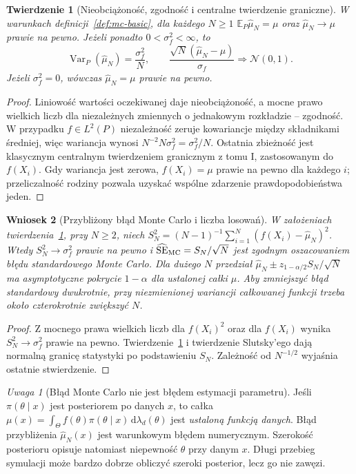 \documentclass[11pt,a4paper,oneside]{report}
\numberwithin{equation}{chapter}
\theoremstyle{plain}
\newtheorem{twierdzenie}{Twierdzenie}[chapter]
\newtheorem{wniosek}[twierdzenie]{Wniosek}
\theoremstyle{definition}
\theoremstyle{remark}
\newtheorem{uwaga}{Uwaga}[chapter]
\newcommand{\E}{\mathbb E}
\newcommand{\Var}{\operatorname{Var}}
\newcommand{\dd}{\mathrm d}
\newcommand{\Normal}{\mathcal N}
\begin{document}
\begin{twierdzenie}[Nieobciążoność, zgodność i centralne twierdzenie graniczne]
\label{thm:mc-lln-clt}
W warunkach definicji~\ref{def:mc-basic}, dla każdego $N\ge1$
$\E_P\widehat\mu_N=\mu$ oraz $\widehat\mu_N\to\mu$
prawie na pewno. Jeżeli ponadto $0<\sigma_f^2<\infty$, to
\[
 \Var_P(\widehat\mu_N)=\frac{\sigma_f^2}{N},\qquad
 \frac{\sqrt N(\widehat\mu_N-\mu)}{\sigma_f}
 \Rightarrow\Normal(0,1).
\]
Jeżeli $\sigma_f^2=0$, wówczas $\widehat\mu_N=\mu$ prawie na pewno.
\end{twierdzenie}
\begin{proof}
Liniowość wartości oczekiwanej daje nieobciążoność, a mocne prawo
wielkich liczb dla niezależnych zmiennych o jednakowym rozkładzie
-- zgodność. W przypadku $f\in L^2(P)$ niezależność zeruje
kowariancje między składnikami średniej, więc wariancja wynosi
$N^{-2}N\sigma_f^2=\sigma_f^2/N$.
Ostatnia zbieżność jest klasycznym centralnym twierdzeniem granicznym
z tomu I, zastosowanym do $f(X_i)$. Gdy wariancja jest zerowa,
$f(X_i)=\mu$ prawie na pewno dla każdego $i$; przeliczalność
rodziny pozwala uzyskać wspólne zdarzenie prawdopodobieństwa jeden.
\end{proof}

\begin{wniosek}[Przybliżony błąd Monte Carlo i liczba losowań]
\label{cor:mc-se}
W założeniach twierdzenia~\ref{thm:mc-lln-clt}, przy $N\ge2$, niech
$S_N^2=(N-1)^{-1}\sum_{i=1}^N(f(X_i)-\widehat\mu_N)^2$.
Wtedy $S_N^2\to\sigma_f^2$ prawie na pewno i
$\widehat{\mathrm{SE}}_{\rm MC}=S_N/\sqrt N$ jest zgodnym
oszacowaniem błędu standardowego Monte Carlo. Dla dużego $N$
przedział $\widehat\mu_N\pm z_{1-\alpha/2}S_N/\sqrt N$
ma asymptotyczne pokrycie $1-\alpha$ dla ustalonej całki $\mu$.
Aby zmniejszyć błąd standardowy dwukrotnie, przy niezmienionej
wariancji całkowanej funkcji trzeba około \emph{czterokrotnie}
zwiększyć $N$.
\end{wniosek}
\begin{proof}
Z mocnego prawa wielkich liczb dla $f(X_i)^2$ oraz dla $f(X_i)$
wynika $S_N^2\to\sigma_f^2$ prawie na pewno.
Twierdzenie~\ref{thm:mc-lln-clt} i twierdzenie Slutsky'ego
dają normalną granicę statystyki po podstawieniu $S_N$.
Zależność od $N^{-1/2}$ wyjaśnia ostatnie stwierdzenie.
\end{proof}

\begin{uwaga}[Błąd Monte Carlo nie jest błędem estymacji parametru]
Jeśli $\pi(\theta\mid x)$ jest posteriorem po danych $x$, to
całka $\mu(x)=\int_\Theta f(\theta)\pi(\theta\mid x)\,
\dd\lambda_d(\theta)$ jest \emph{ustaloną funkcją danych}.
Błąd przybliżenia $\widehat\mu_N(x)$ jest warunkowym błędem
numerycznym. Szerokość posterioru opisuje natomiast niepewność
$\theta$ przy danym $x$. Długi przebieg symulacji może bardzo dobrze
obliczyć szeroki posterior, lecz go nie zawęzi.
\end{uwaga}
\end{document}
